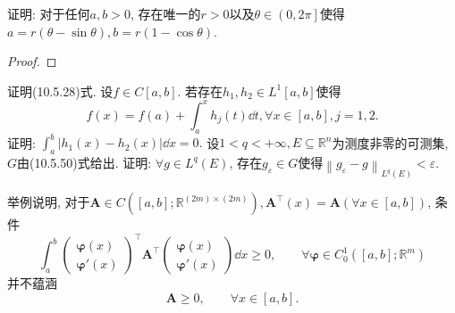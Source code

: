 \begin{quiza}
\woe 证明: 对于任何\(a,b>0\), 存在唯一的\(r>0\)以及\(\theta\in\left(0,2\pi\right]\)使得\(a=r\left(\theta-\sin\theta\right),b=r\left(1-\cos \theta\right)\).
\begin{proof}
	
\end{proof}
\woe 证明(10.5.28)式.
\woe 设\(f\in C[a,b]\). 若存在\(h_1,h_2\in L^1[a,b]\)使得\[f(x)=f(a)+\int_{a}^{x}h_j(t)\dd t,\forall x\in[a,b],j=1,2.\]证明: \(\int_{a}^{b}\left|h_1(x)-h_2(x)\right|\dd x=0.\)
\woe 设\(1<q<+\infty,E\subseteq\mathbb{R}^n\)为测度非零的可测集, \(G\)由(10.5.50)式给出. 证明: \(\forall g\in L^q(E)\), 存在\(g_{\varepsilon}\in G\)使得\(\left\|g_{\varepsilon}-g\right\|_{L^q(E)}<\varepsilon\).
\end{quiza}
\begin{quizb}
\woe 举例说明, 对于\(\boldsymbol{A}\in C([a,b];\mathbb{R}^{(2m)\times(2m)}),\boldsymbol{A}^\top(x)=\boldsymbol{A}(\forall x\in [a,b])\), 条件\[\int_{a}^{b}\left(\begin{matrix}
\boldsymbol{\varphi}(x)\\\boldsymbol{\varphi}'(x)
\end{matrix}\right)^\top\boldsymbol{A}^\top\left(\begin{matrix}
\boldsymbol{\varphi}(x)\\\boldsymbol{\varphi}'(x)
\end{matrix}\right)\dd x\geqslant 0,\qquad\forall\boldsymbol{\varphi}\in C_0^1([a,b];\mathbb{R}^m)\]并不蕴涵\[\boldsymbol{A}\geqslant 0,\qquad\forall x\in [a,b].\]
\end{quizb}